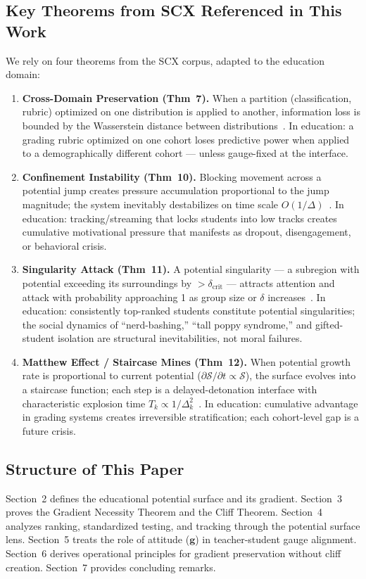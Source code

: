 \documentclass[11pt,a4paper]{article}
\begin{document}
\subsection{Key Theorems from SCX Referenced in This Work}
We rely on four theorems from the SCX corpus, adapted to the education domain:
\begin{enumerate}[label=\textbf{Thm~\arabic*.}, leftmargin=*]
    \item \textbf{Cross-Domain Preservation (Thm~7).} When a partition (classification, rubric) optimized on one distribution is applied to another, information loss is bounded by the Wasserstein distance between distributions~\cite{scx_thm7}. In education: a grading rubric optimized on one cohort loses predictive power when applied to a demographically different cohort — unless gauge-fixed at the interface.
    \item \textbf{Confinement Instability (Thm~10).} Blocking movement across a potential jump creates pressure accumulation proportional to the jump magnitude; the system inevitably destabilizes on time scale $O(1/\Delta)$~\cite{scx_moe_gauge}. In education: tracking/streaming that locks students into low tracks creates cumulative motivational pressure that manifests as dropout, disengagement, or behavioral crisis.
    \item \textbf{Singularity Attack (Thm~11).} A potential singularity — a subregion with potential exceeding its surroundings by $>\delta_{\text{crit}}$ — attracts attention and attack with probability approaching 1 as group size or $\delta$ increases~\cite{scx_moe_gauge}. In education: consistently top-ranked students constitute potential singularities; the social dynamics of ``nerd-bashing,'' ``tall poppy syndrome,'' and gifted-student isolation are structural inevitabilities, not moral failures.
    \item \textbf{Matthew Effect / Staircase Mines (Thm~12).} When potential growth rate is proportional to current potential ($\partial\mathcal{S}/\partial t \propto \mathcal{S}$), the surface evolves into a staircase function; each step is a delayed-detonation interface with characteristic explosion time $T_k \propto 1/\Delta_k^2$~\cite{scx_moe_gauge}. In education: cumulative advantage in grading systems creates irreversible stratification; each cohort-level gap is a future crisis.
\end{enumerate}
\subsection{Structure of This Paper}
Section~2 defines the educational potential surface and its gradient. Section~3 proves the Gradient Necessity Theorem and the Cliff Theorem. Section~4 analyzes ranking, standardized testing, and tracking through the potential surface lens. Section~5 treats the role of attitude ($\mathbf{g}$) in teacher-student gauge alignment. Section~6 derives operational principles for gradient preservation without cliff creation. Section~7 provides concluding remarks.
\end{document}
